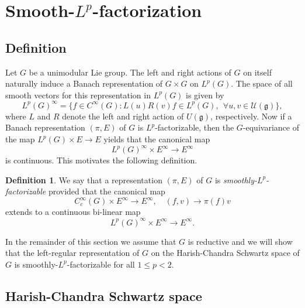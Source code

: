 \documentclass[12pt,letterpaper,titlepage,reqno]{amsart}
\theoremstyle{plain}
\theoremstyle{definition}
\newtheorem{definition}[theorem]{Definition}
\numberwithin{equation}{section}
\def\gf{\mathfrak{g}}
\begin{document}
\section{Smooth-$L^{p}$-factorization}
\subsection{Definition}
Let $G$ be a unimodular Lie group.
The left and right actions of $G$ on itself naturally induce a Banach representation of $G\times G$ on $L^p(G)$. The space of all smooth vectors for this representation in $L^{p}(G)$ is given by
$$
L^p(G)^{\infty}
=\{f \in C^{\infty}(G): L(u)R(v)f\in L^p(G),~~\forall u,v\in \mathcal{U}(\mathfrak{g})\},
$$
where $L$ and $R$ denote the left and right action of $U(\gf)$, respectively.
Now if  a Banach representation $(\pi, E)$ of $G$ is $L^p$-factorizable, then the $G$-equivariance of the map $L^p(G)\times E\rightarrow E$ yields that the canonical map
$$
L^p(G)^{\infty}\times E^{\infty}\rightarrow E^{\infty}
$$
is continuous. This motivates the following definition.
\begin{definition}
We say that a representation $(\pi,E)$ of $G$ is {\em{smoothly-$L^p$-factorizable}} provided that the canonical map
$$
C_c^{\infty}(G)\times E^{\infty}\rightarrow E^{\infty},\quad(f,v)\rightarrow \pi(f)v
$$
extends to a continuous bi-linear map
$$
L^p(G)^{\infty}\times E^{\infty} \rightarrow E^{\infty}.
$$
\end{definition}

In the remainder of this section we assume that $G$ is reductive and we will show that the left-regular representation of $G$ on the Harish-Chandra Schwartz space of $G$ is smoothly-$L^{p}$-factorizable for all $1\leq p<2$.

\subsection{Harish-Chandra Schwartz space}
\end{document}
